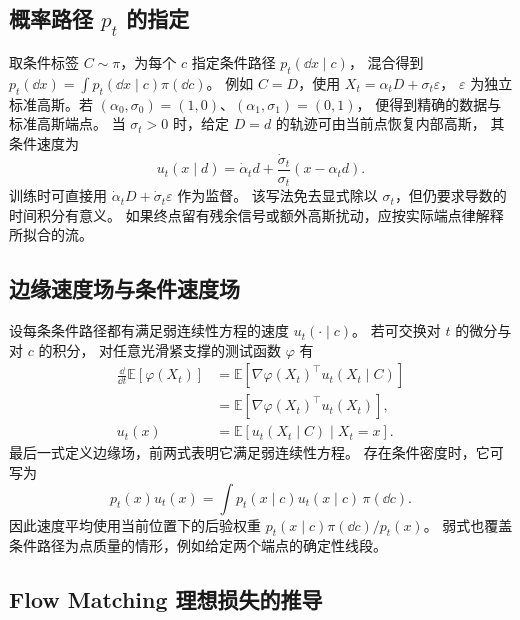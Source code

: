 \subsection{概率路径 \texorpdfstring{\(p_t\)}{p\_t} 的指定}

取条件标签 \(C\sim\pi\)，为每个 \(c\) 指定条件路径 \(p_t(\dd x\mid c)\)，
混合得到 \(p_t(\dd x)=\int p_t(\dd x\mid c)\pi(\dd c)\)。
例如 \(C=D\)，使用 \(X_t=\alpha_tD+\sigma_t\varepsilon\)，
\(\varepsilon\) 为独立标准高斯。若
\((\alpha_0,\sigma_0)=(1,0)\)、\((\alpha_1,\sigma_1)=(0,1)\)，
便得到精确的数据与标准高斯端点。
当 \(\sigma_t>0\) 时，给定 \(D=d\) 的轨迹可由当前点恢复内部高斯，
其条件速度为
\begin{equation}
  u_t(x\mid d)=\dot\alpha_t d+
                   \frac{\dot\sigma_t}{\sigma_t}(x-\alpha_t d).
  \label{eq:training-fm-cond-gauss}
\end{equation}
训练时可直接用 \(\dot\alpha_tD+\dot\sigma_t\varepsilon\) 作为监督。
该写法免去显式除以 \(\sigma_t\)，但仍要求导数的时间积分有意义。
如果终点留有残余信号或额外高斯扰动，应按实际端点律解释所拟合的流。

\subsection{边缘速度场与条件速度场}

设每条条件路径都有满足弱连续性方程的速度 \(u_t(\cdot\mid c)\)。
若可交换对 \(t\) 的微分与对 \(c\) 的积分，
对任意光滑紧支撑的测试函数 \(\varphi\) 有
\begin{equation}
  \begin{aligned}
  \frac{\dd}{\dd t}\mathbb E[\varphi(X_t)]
    &=\mathbb E[\nabla\varphi(X_t)^\top u_t(X_t\mid C)]\\
    &=\mathbb E[\nabla\varphi(X_t)^\top u_t(X_t)],\\
  u_t(x)&=\mathbb E[u_t(X_t\mid C)\mid X_t=x].
  \end{aligned}
  \label{eq:training-fm-current}
\end{equation}
最后一式定义边缘场，前两式表明它满足弱连续性方程。
存在条件密度时，它可写为
\[
  p_t(x)u_t(x)=\int p_t(x\mid c)u_t(x\mid c)\,\pi(\dd c).
\]
因此速度平均使用当前位置下的后验权重
\(p_t(x\mid c)\pi(\dd c)/p_t(x)\)。
弱式也覆盖条件路径为点质量的情形，例如给定两个端点的确定性线段。

\subsection{Flow Matching 理想损失的推导}

